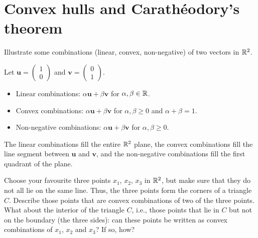 \section{Convex hulls and Carathéodory's theorem}

\begin{exercise}
  Illustrate some combinations (linear, convex, non-negative) of two vectors in $\mathbb{R}^2$.
\end{exercise}

\begin{solution}
  Let $\mathbf{u} =
  \begin{pmatrix} 1 \\ 0
  \end{pmatrix}$ and $\mathbf{v} =
  \begin{pmatrix} 0 \\ 1
  \end{pmatrix}$.
  \begin{itemize}
    \item Linear combinations: $\alpha \mathbf{u} + \beta \mathbf{v}$ for $\alpha, \beta \in \mathbb{R}$.
    \item Convex combinations: $\alpha \mathbf{u} + \beta \mathbf{v}$ for $\alpha, \beta \geq 0$ and $\alpha + \beta = 1$.
    \item Non-negative combinations: $\alpha \mathbf{u} + \beta \mathbf{v}$ for $\alpha, \beta \geq 0$.
  \end{itemize}
  The linear combinations fill the entire $\mathbb{R}^2$ plane, the convex combinations fill the line segment between $\mathbf{u}$ and $\mathbf{v}$, and the non-negative combinations fill the first quadrant of the plane.
\end{solution}

\begin{exercise}
  Choose your favourite three points $x_1$, $x_2$, $x_3$ in $\mathbb{R}^2$, but make sure that they do not all lie on the same line.
  Thus, the three points form the corners of a triangle $C$.
  Describe those points that are convex combinations of two of the three points.
  What about the interior of the triangle $C$, i.e., those points that lie in $C$ but not on the boundary (the three sides): can these points be written as convex combinations of $x_1$, $x_2$ and $x_3$? If so, how?
\end{exercise}

